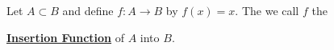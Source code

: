 \newcommand{\InsertionFunction}[0]{
    \textbf{\hyperref[def:InsertionFunction]{Insertion Function}}
}
\newcommand{\InsertionFunctions}[0]{
    \textbf{\hyperref[def:InsertionFunction]{Insertion Functions}}
}\begin{df}
\label{def:InsertionFunction}

\rm
    Let $A \subset B$ and define 
    $f:A \to B$ by $f(x)=x$. 
    The we call $f$ the 
    \InsertionFunction of $A$ into $B$. 
\end{df}

